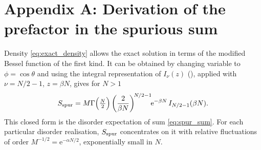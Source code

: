\documentclass[letterpaper]{article} %
\newcommand{\e}{{\mathrm{e}}}
\newcommand{\Bnet}{\beta}
\begin{document}




\appendix

\section{Appendix A: Derivation of the prefactor in the spurious sum}

Density \eqref{eq:exact_density} allows the exact solution in terms 
of the modified Bessel function of the first kind. It can be obtained by changing 
variable to $\phi = \cos\theta$ and using the integral representation of $I_\nu(z)$
(\citealp[8.431.3]{gradshteyn2015}), applied with $\nu = N/2 - 1$, $z = \Bnet N$, gives for $N>1$
\begin{equation}
S_{\rm spur} = M \Gamma\Big(\tfrac{N}{2}\Big)\left(\frac{2}{\Bnet N}\right)^{\!N/2-1}\!\!\e^{-\Bnet N}\,I_{N/2-1}(\Bnet N).
\label{eq:spurious_exact}
\end{equation}
This closed form is the disorder expectation of sum \eqref{eq:spur_sum}. For each particular disorder realisation, 
$S_{\rm spur}$ concentrates on it with relative fluctuations of order $M^{-1/2} = \e^{-\alpha N/2}$, 
exponentially small in $N$.
\end{document}
